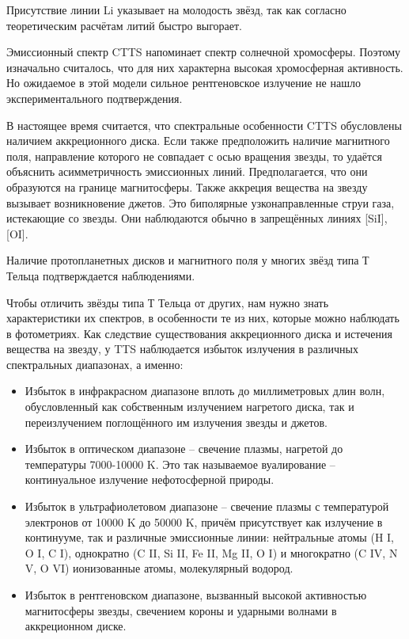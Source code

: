 Присутствие линии Li указывает на молодость звёзд, так как согласно теоретическим расчётам литий быстро выгорает.

Эмиссионный спектр CTTS напоминает спектр солнечной хромосферы. Поэтому изначально считалось, что для них характерна высокая хромосферная активность. Но ожидаемое в этой модели сильное рентгеновское излучение не нашло экспериментального подтверждения.

В настоящее время считается, что спектральные особенности CTTS обусловлены наличием аккреционного диска. Если также предположить наличие магнитного поля, направление которого не совпадает с осью вращения звезды, то удаётся объяснить асимметричность эмиссионных линий. Предполагается, что они образуются на границе магнитосферы. Также аккреция вещества на звезду вызывает возникновение джетов. Это биполярные узконаправленные струи газа, истекающие со звезды. Они наблюдаются обычно в запрещённых линиях [SiI], [OI].

Наличие протопланетных дисков и магнитного поля у многих звёзд типа Т Тельца подтверждается наблюдениями.

Чтобы отличить звёзды типа Т Тельца от других, нам нужно знать характеристики их спектров, в особенности те из них, которые можно наблюдать в фотометриях. Как следствие существования аккреционного диска и истечения вещества на звезду, у TTS наблюдается избыток излучения в различных спектральных диапазонах, а именно:
\begin{itemize}
	\item Избыток в инфракрасном диапазоне вплоть до миллиметровых длин волн, обусловленный как собственным излучением нагретого диска, так и переизлучением поглощённого им излучения звезды и джетов.
	\item Избыток в оптическом диапазоне – свечение плазмы, нагретой до температуры 7000-10000 K. Это так называемое вуалирование – континуальное излучение нефотосферной природы. 
	\item Избыток в ультрафиолетовом диапазоне – свечение плазмы с температурой электронов от 10000 K до 50000 K, причём присутствует как излучение в континууме, так и различные эмиссионные линии: нейтральные атомы (H I, O I, C I), однократно (C II, Si II, Fe II, Mg II, O I) и многократно (C IV, N V, O VI) ионизованные атомы, молекулярный водород.
	\item Избыток в рентгеновском диапазоне, вызванный высокой активностью магнитосферы звезды, свечением короны и ударными волнами в аккреционном диске.
\end{itemize}
